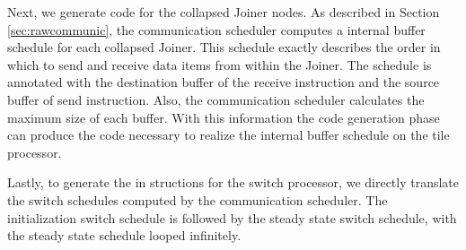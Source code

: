 Next, we generate code for the collapsed Joiner nodes.  As described
in Section \ref{sec:rawcommunic}, the communication scheduler computes
a internal buffer schedule for each collapsed Joiner.  This schedule
exactly describes the order in which to send and receive data items
from within the Joiner.  The schedule is annotated with the
destination buffer of the receive instruction and the source buffer of
send instruction.  Also, the communication scheduler calculates the
maximum size of each buffer.  With this information the code
generation phase can produce the code necessary to realize the
internal buffer schedule on the tile processor.

Lastly, to generate the in
structions for the switch processor, we
directly translate the switch schedules computed by the communication
scheduler.  The initialization switch schedule is followed by the steady
state switch schedule, with the steady state schedule looped infinitely.
